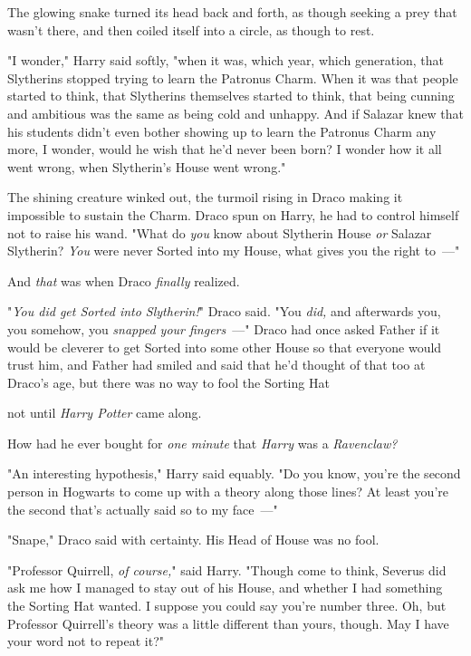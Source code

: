 The glowing snake turned its head back and forth, as though seeking a prey that
wasn't there, and then coiled itself into a circle, as though to rest.

"I wonder," Harry said softly, "when it was, which year, which generation, that
Slytherins stopped trying to learn the Patronus Charm. When it was that people
started to think, that Slytherins themselves started to think, that being
cunning and ambitious was the same as being cold and unhappy. And if Salazar
knew that his students didn't even bother showing up to learn the Patronus
Charm any more, I wonder, would he wish that he'd never been born? I wonder how
it all went wrong, when Slytherin's House went wrong."

The shining creature winked out, the turmoil rising in Draco making it
impossible to sustain the Charm. Draco spun on Harry, he had to control himself
not to raise his wand. "What do \emph{you} know about Slytherin House \emph{or}
Salazar Slytherin? \emph{You} were never Sorted into my House, what gives you
the right to~---"

And \emph{that} was when Draco \emph{finally} realized.

"\emph{You did get Sorted into Slytherin!}" Draco said. "You \emph{did,} and
afterwards you, you somehow, you \emph{snapped your fingers}~---" Draco had once
asked Father if it would be cleverer to get Sorted into some other House so
that everyone would trust him, and Father had smiled and said that he'd thought
of that too at Draco's age, but there was no way to fool the Sorting Hat{\el}

{\el} not until \emph{Harry Potter} came along.

How had he ever bought for \emph{one minute} that \emph{Harry} was a
\emph{Ravenclaw?}

"An interesting hypothesis," Harry said equably. "Do you know, you're the
second person in Hogwarts to come up with a theory along those lines? At least
you're the second that's actually said so to my face~---"

"Snape," Draco said with certainty. His Head of House was no fool.

"Professor Quirrell, \emph{of course,}" said Harry. "Though come to think,
Severus did ask me how I managed to stay out of his House, and whether I had
something the Sorting Hat wanted. I suppose you could say you're number three.
Oh, but Professor Quirrell's theory was a little different than yours, though.
May I have your word not to repeat it?"

